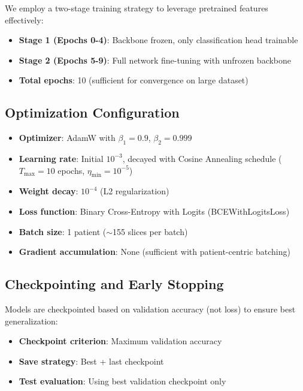 We employ a two-stage training strategy to leverage pretrained features effectively:

\begin{itemize}
    \item \textbf{Stage 1 (Epochs 0-4)}: Backbone frozen, only classification head trainable
    \item \textbf{Stage 2 (Epochs 5-9)}: Full network fine-tuning with unfrozen backbone
    \item \textbf{Total epochs}: 10 (sufficient for convergence on large dataset)
\end{itemize}

\subsection{Optimization Configuration}

\begin{itemize}
    \item \textbf{Optimizer}: AdamW with $\beta_1=0.9$, $\beta_2=0.999$
    \item \textbf{Learning rate}: Initial $10^{-3}$, decayed with Cosine Annealing schedule ($T_{\max}=10$ epochs, $\eta_{\min}=10^{-5}$)
    \item \textbf{Weight decay}: $10^{-4}$ (L2 regularization)
    \item \textbf{Loss function}: Binary Cross-Entropy with Logits (BCEWithLogitsLoss)
    \item \textbf{Batch size}: 1 patient ($\sim$155 slices per batch)
    \item \textbf{Gradient accumulation}: None (sufficient with patient-centric batching)
\end{itemize}

\subsection{Checkpointing and Early Stopping}

Models are checkpointed based on validation accuracy (not loss) to ensure best generalization:
\begin{itemize}
    \item \textbf{Checkpoint criterion}: Maximum validation accuracy
    \item \textbf{Save strategy}: Best + last checkpoint
    \item \textbf{Test evaluation}: Using best validation checkpoint only
\end{itemize}

